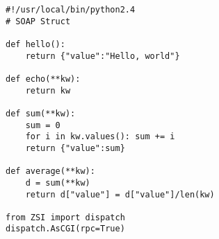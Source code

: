 \begin{verbatim}
#!/usr/local/bin/python2.4
# SOAP Struct

def hello():
    return {"value":"Hello, world"}

def echo(**kw):
    return kw

def sum(**kw):
    sum = 0
    for i in kw.values(): sum += i
	return {"value":sum}

def average(**kw):
	d = sum(**kw)
    return d["value"] = d["value"]/len(kw)

from ZSI import dispatch
dispatch.AsCGI(rpc=True)
\end{verbatim}
